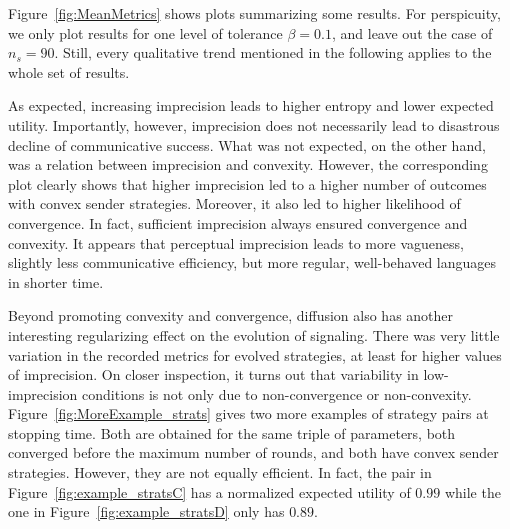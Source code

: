 \documentclass[fleqn,reqno,10pt]{article}
\begin{document}
Figure~\ref{fig:MeanMetrics} shows plots summarizing some results.  For perspicuity, we only
plot results for one level of tolerance $\beta = 0.1$, and leave out the case of $n_s =
90$. Still, every qualitative trend mentioned in the following applies to the whole set of
results.

As expected, increasing imprecision leads to higher entropy and lower
expected utility. Importantly, however, imprecision does not
necessarily lead to disastrous decline of communicative success. What
was not expected, on the other hand, was a relation between
imprecision and convexity. However, the corresponding plot clearly
shows that higher imprecision led to a higher number of outcomes with
convex sender strategies. Moreover, it also led to higher likelihood
of convergence. In fact, sufficient imprecision always ensured
convergence and convexity. It appears that perceptual imprecision
leads to more vagueness, slightly less communicative efficiency, but
more regular, well-behaved languages in shorter time.

Beyond promoting convexity and convergence, diffusion also has another interesting
regularizing effect on the evolution of signaling. There was very
little variation in the recorded metrics for evolved strategies, at
least for higher values of imprecision. On closer inspection, it turns
out that variability in low-imprecision conditions is not only due to
non-convergence or non-convexity. Figure~\ref{fig:MoreExample_strats}
gives two more examples of strategy pairs at stopping time. Both are
obtained for the same triple of parameters, both converged before the
maximum number of rounds, and both have
convex sender strategies. However, they are not equally efficient. In
fact, the pair in Figure~\ref{fig:example_stratsC} has a normalized
expected utility of $0.99$ while the one in
Figure~\ref{fig:example_stratsD} only has $0.89$.
\end{document}
